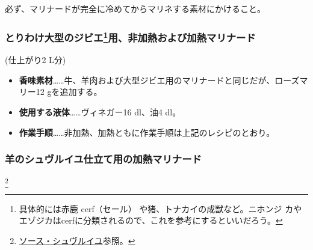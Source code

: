 \begin{recette}
\begin{itemize}
  必ず、マリナードが完全に冷めてからマリネする素材にかけること。
\end{itemize}

\maeaki

\hypertarget{marinade-crue-ou-cuite-pour-grosse-venaison}{%
\subsubsection[とりわけ大型のジビエ用、非加熱および加熱マリナード]{\texorpdfstring{とりわけ大型のジビエ\footnote{具体的には赤鹿
  cerf（セール） や猪、トナカイの成獣など。ニホンジ
  カやエゾジカはcerfに分類されるので、これを参考にするといいだろう。}用、非加熱および加熱マリナード}{とりわけ大型のジビエ用、非加熱および加熱マリナード}}\label{marinade-crue-ou-cuite-pour-grosse-venaison}}



(仕上がり2 L分)

\begin{itemize}
\item
  \textbf{香味素材}\ldots{}\ldots{}牛、羊肉および大型ジビエ用のマリナードと同じだが、ローズマリー12
  gを追加する。
\item
  \textbf{使用する液体}\ldots{}\ldots{}ヴィネガー16 dl、油4 dl。
\item
  \textbf{作業手順}\ldots{}\ldots{}非加熱、加熱ともに作業手順は上記のレシピのとおり。
\end{itemize}

\maeaki

\hypertarget{marinade-cuite-pour-le-mouton-en-chevreuil}{%
\subsubsection{羊のシュヴルイユ仕立て用の加熱マリナード}\label{marinade-cuite-pour-le-mouton-en-chevreuil}}

\footnote{\protect\hyperlink{sauce-chevreuil}{ソース・シュヴルイユ}参照。}



\end{recette}
